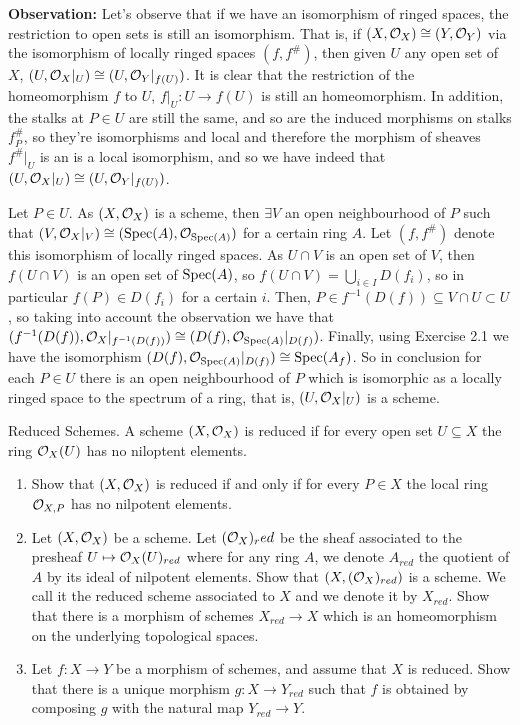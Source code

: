 \begin{sol}
	\textbf{Observation:} Let's observe that if we have an isomorphism of ringed spaces, the restriction to open sets is still an isomorphism. That is, if $(X, \mathcal{O}_X) \cong (Y, \mathcal{O}_Y)$ via the isomorphism of locally ringed spaces $(f, f^{\#})$, then given $U$ any open set of $X$, $(U, \mathcal{O}_X|_U) \cong (U, \mathcal{O}_Y|_{f(U)})$. It is clear that the restriction of the homeomorphism $f$ to $U$, $f|_U: U \to f(U)$ is still an homeomorphism. In addition, the stalks at $P \in U$ are still the same, and so are the induced morphisms on stalks $f^{\#}_P$, so they're isomorphisms and local and therefore the morphism of sheaves $f^{\#}|_U$ is an is a local isomorphism, and so we have indeed that $(U, \mathcal{O}_X|_U) \cong (U, \mathcal{O}_Y|_{f(U)})$.

	Let $P \in U$. As $(X, \mathcal{O}_X)$ is a scheme, then $\exists V$ an open neighbourhood of $P$ such that $(V,\mathcal{O}_X|_V) \cong (\mathrm{Spec} (A), \mathcal{O}_{\mathrm{Spec}(A)})$ for a certain ring $A$. Let $(f, f^{\#})$ denote this isomorphism of locally ringed spaces. As $U \cap V$ is an open set of $V$, then $f(U \cap V)$ is an open set of $\mathrm{Spec}(A)$, so $f(U \cap V) = \bigcup_{i \in I} D(f_i)$, so in particular $f(P) \in D(f_i)$ for a certain $i$. Then, $P \in f^{-1}(D(f)) \subseteq V \cap U \subset U$, so taking into account the observation we have that $(f^{-1}(D(f)), \mathcal{O}_X|_{f^{-1}(D(f))}) \cong (D(f), \mathcal{O}_{\mathrm{Spec}(A)}|_{D(f)})$. Finally, using Exercise 2.1 we have the isomorphism $(D(f), \mathcal{O}_{\mathrm{Spec}(A)}|_{D(f)}) \cong \mathrm{Spec}(A_f)$. So in conclusion for each $P \in U$ there is an open neighbourhood of $P$ which is isomorphic as a locally ringed space to the spectrum of a ring, that is, $(U, \mathcal{O}_X|_U)$ is a scheme.
\end{sol}

\begin{ex}
	Reduced Schemes. A scheme $(X, \mathcal{O}_X)$ is reduced if for every open set $U \subseteq X$ the ring $\mathcal{O}_X(U)$ has no niloptent elements.
	\begin{enumerate}[label=\alph*)]
		\item Show that $(X, \mathcal{O}_X)$ is reduced if and only if for every $P \in X$ the local ring $\mathcal{O}_{X,P}$ has no nilpotent elements.
		\item Let $(X, \mathcal{O}_X)$ be a scheme. Let $(\mathcal{O}_X)_red$ be the sheaf associated to the presheaf $U \mapsto \mathcal{O}_X(U)_{red}$ where for any ring $A$, we denote $A_{red}$ the quotient of $A$ by its ideal of nilpotent elements. Show that $(X, (\mathcal{O}_X)_{red})$ is a scheme. We call it the reduced scheme associated to $X$ and we denote it by $X_{red}$. Show that there is a morphism of schemes $X_{red} \to X$ which is an homeomorphism on the underlying topological spaces. 
		\item Let $f: X \to Y$ be a morphism of schemes, and assume that $X$ is reduced. Show that there is a unique morphism $g: X \to Y_{red}$ such that $f$ is obtained by composing $g$ with the natural map $Y_{red} \to Y$.
	\end{enumerate}
\end{ex}


